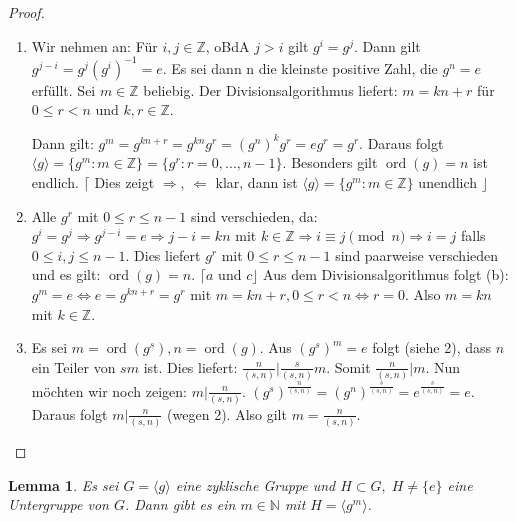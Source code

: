 \documentclass[12pt]{scrartcl} %
\DeclareMathOperator{\ord}{ord}
\newtheorem{lemma}{Lemma}
\theoremstyle{definition}
\theoremstyle{remark}
\begin{document}
\begin{proof} %
	\begin{enumerate}
		\item Wir nehmen an: Für $i,j \in \mathbb{Z}$, oBdA $j>i$ gilt $g^{i}=g^{j}$.
		Dann gilt $g^{j-i}=g^{j}(g^{i})^{-1}=e$.
		Es sei dann n die kleinste positive Zahl, die $g^{n}=e$ erfüllt.
		Sei $m \in \mathbb{Z}$ beliebig.
		Der Divisionsalgorithmus liefert: $m=kn+r$ für $0 \leq r < n$ und $k,r \in \mathbb{Z}$.

		Dann gilt:
		$g^{m}=g^{kn+r}=g^{kn}g^{r}=(g^{n})^{k}g^{r}=eg^{r}=g^{r}$.
		Daraus folgt $\langle g \rangle = \lbrace g^{m} : m \in \mathbb{Z}\rbrace = \lbrace g^{r} : r=0,...,n-1\rbrace$.
		Besonders gilt $\ord(g)=n$ ist endlich.
		$\lceil$ Dies zeigt $\Rightarrow$, $\Leftarrow$ klar, dann ist $\langle g \rangle = \lbrace g^{m} : m \in \mathbb{Z}\rbrace$ unendlich $\rfloor$
		\item Alle $g^{r}$ mit $0 \leq r \leq n-1$ sind verschieden, da:
		$g^{i}=g^{j} \Rightarrow g^{j-i}=e \Rightarrow j-i = kn$ mit $k\in\mathbb{Z} \Rightarrow i \equiv j \pmod{n} \Rightarrow i=j$ falls $0\leq i,j\leq n-1$.
		Dies liefert $g^{r}$ mit $0 \leq r \leq n-1$ sind paarweise verschieden und es gilt: $\ord(g)=n$. $\lceil a$ und $c\rfloor$
		Aus dem Divisionsalgorithmus folgt (b): $g^{m}=e \Leftrightarrow e=g^{kn+r}=g^{r}$ mit $m = kn+r, 0 \leq r < n \Leftrightarrow r=0$.
		Also $m=kn$ mit $k \in \mathbb{Z}$. %
		\item Es sei $m=\ord(g^{s}), n =\ord(g)$.
		Aus $(g^{s})^{m}=e$ folgt (siehe 2), dass $n$ ein Teiler von $sm$ ist.
		Dies liefert: $\frac{n}{(s,n)} \vert \frac{s}{(s,n)}m$. Somit $\frac{n}{(s,n)} \vert m$.
		Nun möchten wir noch zeigen: $m \vert \frac{n}{(s,n)}$. $(g^{s})^{\frac{n}{(s,n)}} = (g^{n})^{\frac{s}{(s,n)}}=e^{\frac{s}{(s,n)}}=e$.
		Daraus folgt $m \vert \frac{n}{(s,n)}$ (wegen 2).
		Also gilt $m = \frac{n}{(s,n)}$. \qedhere
	\end{enumerate}
\end{proof}

\begin{lemma}
	Es sei $G = \langle g \rangle$ eine zyklische Gruppe und $H \subset G,\; H\neq\{e\}$ eine Untergruppe von $G$. %
	Dann gibt es ein $m\in\mathbb{N}$ mit $H=\langle g^m\rangle$.
\end{lemma}
\end{document}
